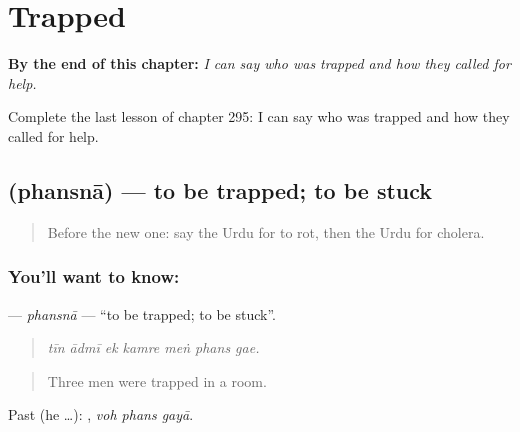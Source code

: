 
\chapter{Trapped}
\label{ch:ur-trapped}

\begin{chapteropening}
\textbf{By the end of this chapter:} \emph{I can say who was trapped and how they called for help.}

Complete the last lesson of chapter 295: I can say who was trapped and how they called for help.
\end{chapteropening}

\section[\texorpdfstring{\ur{پھنسنا} (phansnā)}{پھنسنا (phansnā)}]{ (phansnā) — to be trapped; to be stuck}

\label{lesson:UR-C295-phansna}



\begin{quote}
Before the new one: say the Urdu for to rot, then the Urdu for cholera.
\end{quote}

\subsection*{You'll want to know: }
\textbf{} — \emph{phansnā} — \textquotedblleft{}to be trapped; to be stuck\textquotedblright{}.

\begin{quote}
      
\end{quote}

\begin{quote}
\emph{tīn ādmī ek kamre meṅ phans gae.}
\end{quote}

\begin{quote}
Three men were trapped in a room.
\end{quote}

Past (he …):   , \emph{voh phans gayā}.

